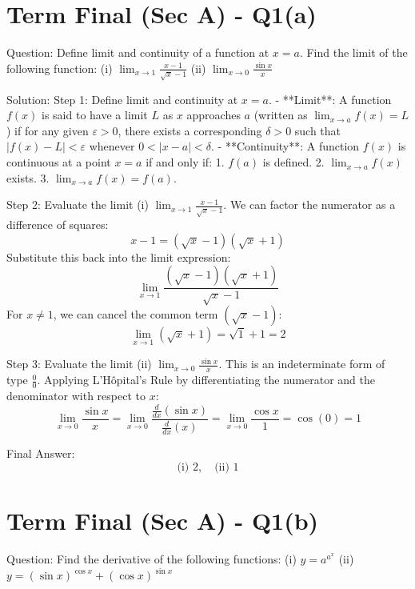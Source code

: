 \documentclass[11pt, a4paper]{article}
\begin{document}

\section*{Term Final (Sec A) - Q1(a)}
Question:
Define limit and continuity of a function at $x = a$. Find the limit of the following function:
(i) $\lim_{x \to 1} \frac{x-1}{\sqrt{x}-1}$
(ii) $\lim_{x \to 0} \frac{\sin x}{x}$

Solution:
Step 1: Define limit and continuity at $x = a$.
- **Limit**: A function $f(x)$ is said to have a limit $L$ as $x$ approaches $a$ (written as $\lim_{x \to a} f(x) = L$) if for any given $\varepsilon > 0$, there exists a corresponding $\delta > 0$ such that $|f(x) - L| < \varepsilon$ whenever $0 < |x - a| < \delta$.
- **Continuity**: A function $f(x)$ is continuous at a point $x = a$ if and only if:
  1. $f(a)$ is defined.
  2. $\lim_{x \to a} f(x)$ exists.
  3. $\lim_{x \to a} f(x) = f(a)$.

Step 2: Evaluate the limit (i) $\lim_{x \to 1} \frac{x-1}{\sqrt{x}-1}$.
We can factor the numerator as a difference of squares:
$$x - 1 = (\sqrt{x} - 1)(\sqrt{x} + 1)$$
Substitute this back into the limit expression:
$$\lim_{x \to 1} \frac{(\sqrt{x}-1)(\sqrt{x}+1)}{\sqrt{x}-1}$$
For $x \neq 1$, we can cancel the common term $(\sqrt{x}-1)$:
$$\lim_{x \to 1} (\sqrt{x} + 1) = \sqrt{1} + 1 = 2$$

Step 3: Evaluate the limit (ii) $\lim_{x \to 0} \frac{\sin x}{x}$.
This is an indeterminate form of type $\frac{0}{0}$. Applying L'H\^opital's Rule by differentiating the numerator and the denominator with respect to $x$:
$$\lim_{x \to 0} \frac{\sin x}{x} = \lim_{x \to 0} \frac{\frac{d}{dx}(\sin x)}{\frac{d}{dx}(x)} = \lim_{x \to 0} \frac{\cos x}{1} = \cos(0) = 1$$

Final Answer:
$$
\boxed{\text{(i) } 2, \quad \text{(ii) } 1}
$$


\section*{Term Final (Sec A) - Q1(b)}
Question:
Find the derivative of the following functions:
(i) $y = a^{a^x}$
(ii) $y = (\sin x)^{\cos x} + (\cos x)^{\sin x}$
\end{document}
